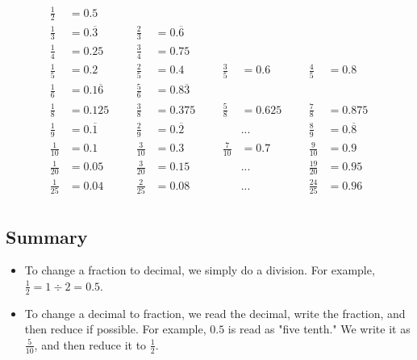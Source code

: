 \[
\begin{aligned}
	\frac{1}{2}&=0.5 \\
	\frac{1}{3}&=0.\overline{3} &\phantom{aaa} \frac{2}{3}&=0.\overline{6} \\
	\frac{1}{4}&=0.25 &\phantom{aaa} \frac{3}{4}&=0.75 \\
	\frac{1}{5}&=0.2 &\phantom{aaa} \frac{2}{5}&=0.4 &\phantom{aaa} \frac{3}{5}&=0.6 &\phantom{aaa} \frac{4}{5}&=0.8 \\
	\frac{1}{6}&=0.1\overline{6} &\phantom{aaa} \frac{5}{6}&=0.8\overline{3} \\
	\frac{1}{8}&=0.125 &\phantom{aaa} \frac{3}{8}&=0.375 &\phantom{aaa} \frac{5}{8}&=0.625 &\phantom{aaa} \frac{7}{8}&=0.875 \\
	\frac{1}{9}&=0.\overline{1} &\phantom{aaa} \frac{2}{9}&=0.\overline{2} &\phantom{aaa} &... &\phantom{aaa} \frac{8}{9}&=0.\overline{8} \\
	\frac{1}{10}&=0.1 &\phantom{aaa} \frac{3}{10}&=0.3 &\phantom{aaa} \frac{7}{10}&=0.7 &\phantom{aaa} \frac{9}{10}&=0.9 \\
	\frac{1}{20}&=0.05 &\phantom{aaa} \frac{3}{20}&=0.15 &\phantom{aaa} &... &\phantom{aaa} \frac{19}{20}&=0.95 \\
	\frac{1}{25}&=0.04 &\phantom{aaa} \frac{2}{25}&=0.08 &\phantom{aaa} &... &\phantom{aaa} \frac{24}{25}&=0.96 \\
\end{aligned}
\]

\subsection{Summary}
\begin{itemize}
\item To change a fraction to decimal, we simply do a division. For example, $\frac{1}{2}=1\div2=0.5$.
\item To change a decimal to fraction, we read the decimal, write the fraction, and then reduce if possible. For example, $0.5$ is read as "five tenth." We write it as $\frac{5}{10}$, and then reduce it to $\frac{1}{2}$.
\end{itemize}

